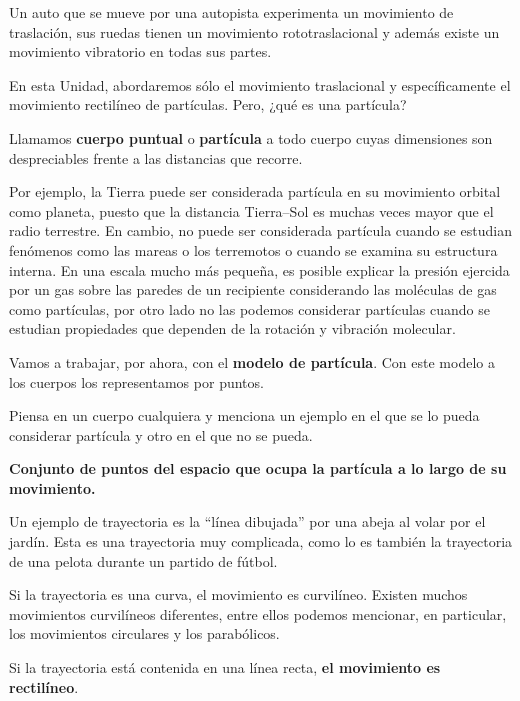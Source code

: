 
Un auto que se mueve por una autopista experimenta un movimiento de traslación, sus ruedas tienen un movimiento rototraslacional y además existe un movimiento vibratorio en todas sus partes.

En esta Unidad, abordaremos sólo el movimiento traslacional y específicamente el movimiento rectilíneo de partículas. Pero, ¿qué es una partícula?

Llamamos {\bf cuerpo puntual} o {\bf partícula} a todo cuerpo cuyas dimensiones son despreciables frente a las distancias que recorre. 

Por ejemplo, la Tierra puede ser considerada partícula en su movimiento orbital como planeta, puesto que la distancia Tierra--Sol es muchas veces mayor que el radio terrestre. En cambio, no puede ser considerada partícula cuando se estudian fenómenos como las mareas o los terremotos o cuando se examina su estructura interna.
En una escala mucho más pequeña, es posible explicar la presión ejercida por un gas sobre las paredes de un recipiente considerando las moléculas de gas como partículas, por otro lado no las podemos considerar partículas cuando se estudian propiedades que dependen de la rotación y vibración molecular. 

Vamos a trabajar, por ahora, con el {\bf \color{NavyBlue} modelo de partícula}. Con este modelo a los cuerpos los representamos por puntos.

\begin{comprension}
Piensa en un cuerpo cualquiera y menciona un ejemplo en el que se lo pueda considerar partícula y otro en el que no se pueda.
\end{comprension}


{\bf Conjunto de puntos del espacio que ocupa la partícula a lo largo de su movimiento.}

Un ejemplo de trayectoria es la ``línea dibujada'' por una abeja al volar por el jardín. Esta es una trayectoria muy complicada, como lo es también la trayectoria de una pelota durante un partido de fútbol.

Si la trayectoria es una curva, el movimiento es curvilíneo. Existen muchos movimientos curvilíneos diferentes, entre ellos podemos mencionar, en particular, los movimientos circulares y los parabólicos.

Si la trayectoria está contenida en una línea recta, {\bf el movimiento es  rectilíneo}.



